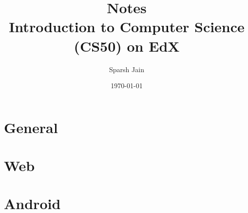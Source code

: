 
\title{Notes\\
	\large Introduction to Computer Science (CS50) on EdX}
\author{Sparsh Jain}
\date{\today}

% 



\maketitle
\tableofcontents

% 
\part{General}










\part{Web}







\part{Android}







